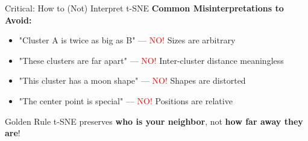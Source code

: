 \documentclass[10pt]{beamer}
\begin{document}
\begin{frame}{Critical: How to (Not) Interpret t-SNE}
\vspace{0.2cm}
\textbf{Common Misinterpretations to Avoid:}
\begin{itemize}
    \setlength\itemsep{0em}
    \item "Cluster A is twice as big as B" — \textcolor{red}{NO!} Sizes are arbitrary
    \item "These clusters are far apart" — \textcolor{red}{NO!} Inter-cluster distance meaningless
    \item "This cluster has a moon shape" — \textcolor{red}{NO!} Shapes are distorted
    \item "The center point is special" — \textcolor{red}{NO!} Positions are relative
\end{itemize}

\vspace{0.15cm}
\begin{alertblock}{Golden Rule}
t-SNE preserves \textbf{who is your neighbor}, not \textbf{how far away they are}!
\end{alertblock}

\end{frame}
\end{document}
